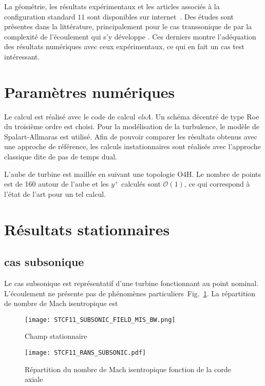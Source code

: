 La géométrie, les résultats expérimentaux et les articles associés à la 
configuration standard $11$ sont disponibles sur internet~\cite{STCF11_url}.
Des études sont présentes dans la littérature, principalement pour le cas 
transsonique de par la complexité de l'écoulement qui s'y développe 
\cite{Cinnella:2004fk, Sbardella:2001fk, Duta:2002uq, Campobasso:2003fk}.
Ces derniers montre l'adéquation des résultats numériques avec ceux expérimentaux, 
ce qui en fait un cas test intéressant.

\section{Paramètres numériques}

Le calcul est réalisé avec le code de calcul \textit{elsA}. Un schéma décentré de type
Roe du troisième ordre est choisi. Pour la modélisation de la turbulence, 
le modèle de Spalart-Allmaras est utilisé. Afin de pouvoir comparer les résultats obtenus
avec une approche de référence, les calculs instationnaires sont réalisés avec l'approche
classique dite de pas de temps dual.

L'aube de turbine est maillée en suivant une topologie O4H. Le nombre de points est de 160
autour de l'aube et les $y^+$ calculés sont $\mathcal{O}(1)$, ce qui correspond à l'état de 
l'art pour un tel calcul.

\section{Résultats stationnaires}

\subsection{cas subsonique}

Le cas subsonique est représentatif d'une turbine fonctionnant au point nominal.
L'écoulement ne présente pas de phénomènes particuliers~Fig.~\ref{fig:stcf11_rans_2D_subsonic}.
La répartition de nombre de Mach isentropique est 

\begin{figure}[htbp]
  \centering
  \texttt{[image: STCF11\_SUBSONIC\_FIELD\_MIS\_BW.png]}
  \caption{Champ stationnaire}
  \label{fig:stcf11_rans_2D_subsonic}
\end{figure}

\begin{figure}[htbp]
  \centering
  \texttt{[image: STCF11\_RANS\_SUBSONIC.pdf]}
  \caption{Répartition du nombre de Mach isentropique fonction de la corde axiale}
  \label{fig:stcf11_rans_mis_subsonic}
\end{figure}



